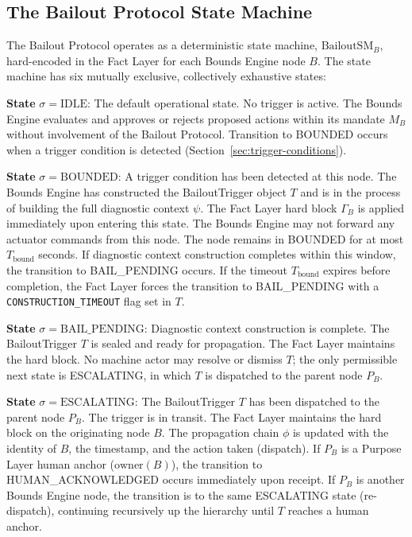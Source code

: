 \subsection{The Bailout Protocol State Machine}
\label{sec:bp-state-machine}

The Bailout Protocol operates as a deterministic state machine, $\text{BailoutSM}_B$, hard-encoded in the Fact Layer for each Bounds Engine node $B$. The state machine has six mutually exclusive, collectively exhaustive states:

\bigskip

\noindent\textbf{State} $\sigma = \text{IDLE}$: The default operational state. No trigger is active. The Bounds Engine evaluates and approves or rejects proposed actions within its mandate $M_B$ without involvement of the Bailout Protocol. Transition to BOUNDED occurs when a trigger condition is detected (Section~\ref{sec:trigger-conditions}).

\bigskip

\noindent\textbf{State} $\sigma = \text{BOUNDED}$: A trigger condition has been detected at this node. The Bounds Engine has constructed the BailoutTrigger object $T$ and is in the process of building the full diagnostic context $\psi$. The Fact Layer hard block $\Gamma_B$ is applied immediately upon entering this state. The Bounds Engine may not forward any actuator commands from this node. The node remains in BOUNDED for at most $T_{\text{bound}}$ seconds. If diagnostic context construction completes within this window, the transition to BAIL\_PENDING occurs. If the timeout $T_{\text{bound}}$ expires before completion, the Fact Layer forces the transition to BAIL\_PENDING with a \texttt{CONSTRUCTION\_TIMEOUT} flag set in $T$.

\bigskip

\noindent\textbf{State} $\sigma = \text{BAIL\_PENDING}$: Diagnostic context construction is complete. The BailoutTrigger $T$ is sealed and ready for propagation. The Fact Layer maintains the hard block. No machine actor may resolve or dismiss $T$; the only permissible next state is ESCALATING, in which $T$ is dispatched to the parent node $P_B$.

\bigskip

\noindent\textbf{State} $\sigma = \text{ESCALATING}$: The BailoutTrigger $T$ has been dispatched to the parent node $P_B$. The trigger is in transit. The Fact Layer maintains the hard block on the originating node $B$. The propagation chain $\phi$ is updated with the identity of $B$, the timestamp, and the action taken (dispatch). If $P_B$ is a Purpose Layer human anchor ($\text{owner}(B)$), the transition to HUMAN\_ACKNOWLEDGED occurs immediately upon receipt. If $P_B$ is another Bounds Engine node, the transition is to the same ESCALATING state (re-dispatch), continuing recursively up the hierarchy until $T$ reaches a human anchor.

